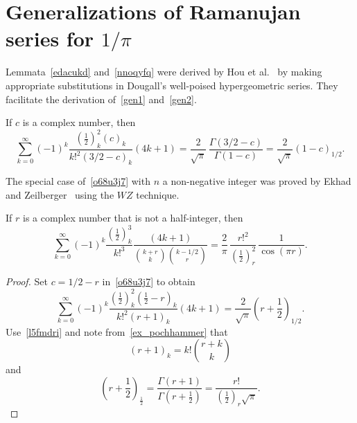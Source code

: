 \documentclass[12pt,reqno]{article}
\begin{document}
\section{Generalizations of Ramanujan series for $1/\pi$}
Lemmata~\ref{edacukd} and~\ref{nnoqyfq} were derived by Hou et al.~\cite{hou24} by making appropriate substitutions in Dougall's well-poised hypergeometric series. They facilitate the derivation of~\eqref{gen1} and~\eqref{gen2}.


\begin{lemma}\label{edacukd}
If $c$ is a complex number, then
\begin{equation}\label{o68u3j7}
\sum_{k = 0}^\infty  {( - 1)^k \frac{{\left( {\frac{1}{2}} \right)_k^2 \left( c \right)_k }}{{k!^2 \left( {3/2 - c} \right)_k }}\left( {4k + 1} \right)}  = \frac{2}{{\sqrt \pi  }}\,\frac{{\Gamma \left( {3/2 - c} \right)}}{{\Gamma \left( {1 - c} \right)}}= \frac{2}{{\sqrt \pi  }}(1-c)_{1/2}.
\end{equation}
\end{lemma}
\begin{remark}
The special case of~\eqref{o68u3j7} with $n$ a non-negative integer was proved by Ekhad and Zeilberger~\cite{ekhad94} using the $WZ$ technique.
\end{remark}
\begin{theorem}
If $r$ is a complex number that is not a half-integer, then
\begin{equation}
\sum_{k = 0}^\infty  {( - 1)^k \frac{{\left( {\frac{1}{2}} \right)_k^3 }}{{k!^3 }}\frac{{\left( {4k + 1} \right)}}{{\binom{{k + r}}{k}\binom{{k - 1/2}}{r}}}}  = \frac{2}{\pi }\,\frac{{r!^2 }}{{\left( {\frac{1}{2}} \right)_r^2 }}\,\frac{1}{{\cos \left( \pi r \right)}}.
\end{equation}
\end{theorem}
\begin{proof}
Set $c=1/2-r$ in~\eqref{o68u3j7} to obtain
\begin{equation}\label{h7933kq}
\sum_{k = 0}^\infty  {( - 1)^k \frac{{\left( {\frac{1}{2}} \right)_k^2 \left( {\frac{1}{2} - r} \right)_k }}{{k!^2 \left( {r + 1} \right)_k }}\left( {4k + 1} \right)}  = \frac{2}{{\sqrt \pi  }}\left( {r + \frac{1}{2}} \right)_{1/2} .
\end{equation}
Use~\eqref{l5fmdri} and note from~\eqref{ex_pochhammer} that
\begin{equation}\label{nly5agg}
\left( {r + 1} \right)_k  = k!\binom{{r + k}}{k}
\end{equation}
and
\begin{equation}\label{g20r5hg}
\left( {r + \frac{1}{2}} \right)_{\frac{1}{2}}  = \frac{{\Gamma \left( {r + 1} \right)}}{{\Gamma \left( {r + \frac{1}{2}} \right)}} = \frac{{r!}}{{\left( {\frac{1}{2}} \right)_r \sqrt \pi  }}.
\end{equation}
\end{proof}
\end{document}
